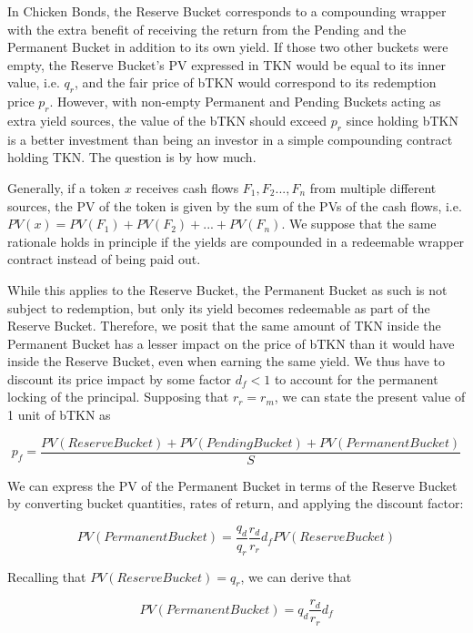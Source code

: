 \documentclass{article}
\begin{document}
In Chicken Bonds, the Reserve Bucket corresponds to a compounding wrapper with the extra benefit of receiving the return from the Pending and the Permanent Bucket in addition to its own yield. If those two other buckets were empty, the Reserve Bucket's PV expressed in TKN would be equal to its inner value, i.e. $q_r$, and the fair price of bTKN would correspond to its redemption price $p_r$. However, with non-empty Permanent and Pending Buckets acting as extra yield sources, the value of the bTKN should exceed $p_r$ since holding bTKN is a better investment than being an investor in a simple compounding contract holding TKN. The question is by how much.

Generally, if a token $x$ receives cash flows $F_1, F_2..., F_n$ from multiple different sources, the PV of the token is given by the sum of the PVs of the cash flows, i.e. $PV(x) = PV(F_1) + PV(F_2) + ... + PV(F_n)$. We suppose that the same rationale holds in principle if the yields are compounded in a redeemable wrapper contract instead of being paid out. 

While this applies to the Reserve Bucket, the Permanent Bucket as such is not subject to redemption, but only its yield becomes redeemable as part of the Reserve Bucket. Therefore, we posit that the same amount of TKN inside the Permanent Bucket has a lesser impact on the price of bTKN than it would have inside the Reserve Bucket, even when earning the same yield. We thus have to discount its price impact by some factor $d_f < 1$ to account for the permanent locking of the principal. Supposing that $r_r = r_m$, we can state the present value of 1 unit of bTKN as

\begin{equation}
  \label{eq:naive-1}
    p_f = \frac{PV(ReserveBucket) + PV(PendingBucket) + PV(PermanentBucket)}{S}
\end{equation}

We can express the PV of the Permanent Bucket in terms of the Reserve Bucket by converting bucket quantities, rates of return, and applying the discount factor:

\begin{equation}
  \label{eq:naive-2}
   PV(PermanentBucket) = \frac{q_d}{q_r} \frac{r_d}{r_r} d_f PV(ReserveBucket)
\end{equation}

Recalling that $PV(ReserveBucket) = q_r$, we can derive that

\begin{equation}
  \label{eq:naive-3}
   PV(PermanentBucket) = q_d \frac{r_d}{r_r} d_f
\end{equation}
\end{document}

